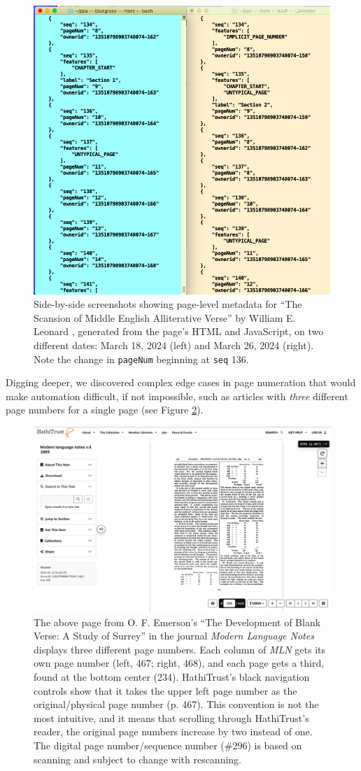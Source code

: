 \documentclass[final]{anthology-ch} %
\begin{document}
\begin{figure}
    \centering
    \includegraphics[width=0.5\linewidth]{images/y.png}
    \caption{Side-by-side screenshots showing page-level metadata for ``The Scansion of Middle English Alliterative Verse'' by William E. Leonard \cite{noauthor_scansion_nodate}, generated from the page's HTML and JavaScript, on two different dates: March 18, 2024 (left) and March 26, 2024 (right). Note the change in \texttt{pageNum} beginning at \texttt{seq} 136.}
    \label{fig:code-comparison}
\end{figure}

Digging deeper, we discovered complex edge cases in page numeration that would make automation difficult, if not impossible, such as articles with \textit{three} different page numbers for a single page (see Figure \ref{fig:MLN}).

\begin{figure}
    \centering
    \includegraphics[width=1\linewidth]{images/hathitrust_MLN_screenshot.png}
    \caption{The above page from O. F. Emerson’s ``The Development of Blank Verse: A Study of Surrey'' in the journal \textit{Modern Language Notes} \cite{emerson_o_f_development_1889} displays three different page numbers. Each column of \textit{MLN }gets its own page number (left, 467; right, 468), and each page gets a third, found at the bottom center (234). HathiTrust's black navigation controls show that it takes the upper left page number as the original/physical page number (p. 467). This convention is not the most intuitive, and it means that scrolling through HathiTrust's reader, the original page numbers increase by two instead of one. The digital page number/sequence number (\#296) is based on scanning and subject to change with rescanning.}
    \label{fig:MLN}
\end{figure}
\end{document}
